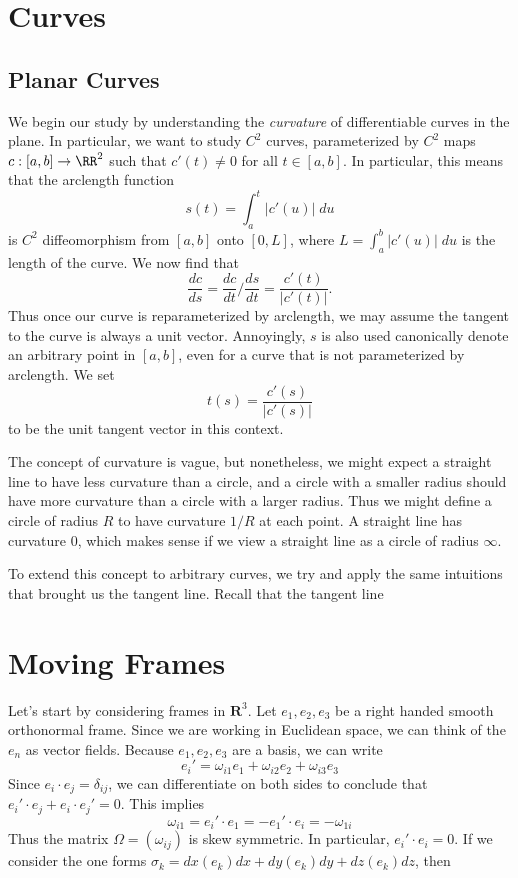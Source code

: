 \chapter{Curves}

\section{Planar Curves}

We begin our study by understanding the \emph{curvature} of differentiable curves in the plane. In particular, we want to study $C^2$ curves, parameterized by $C^2$ maps $c: [a,b] \to \RR^2$ such that $c'(t) \neq 0$ for all $t \in [a,b]$. In particular, this means that the arclength function
%
\[ s(t) = \int_a^t |c'(u)|\; du \]
%
is $C^2$ diffeomorphism from $[a,b]$ onto $[0,L]$, where $L = \int_a^b |c'(u)|\; du$ is the length of the curve. We now find that
%
\[ \frac{dc}{ds} = \frac{dc}{dt} \bigg/ \frac{ds}{dt} = \frac{c'(t)}{|c'(t)|}. \]
%
Thus once our curve is reparameterized by arclength, we may assume the tangent to the curve is always a unit vector. Annoyingly, $s$ is also used canonically denote an arbitrary point in $[a,b]$, even for a curve that is not parameterized by arclength. We set
%
\[ t(s) = \frac{c'(s)}{|c'(s)|} \]
%
to be the unit tangent vector in this context.

The concept of curvature is vague, but nonetheless, we might expect a straight line to have less curvature than a circle, and a circle with a smaller radius should have more curvature than a circle with a larger radius. Thus we might define a circle of radius $R$ to have curvature $1/R$ at each point. A straight line has curvature $0$, which makes sense if we view a straight line as a circle of radius $\infty$.

To extend this concept to arbitrary curves, we try and apply the same intuitions that brought us the tangent line. Recall that the tangent line 




\chapter{Moving Frames}

Let's start by considering frames in $\mathbf{R}^3$. Let $e_1, e_2, e_3$ be a right handed smooth orthonormal frame. Since we are working in Euclidean space, we can think of the $e_n$ as vector fields. Because $e_1, e_2, e_3$ are a basis, we can write
%
\[ e_i' = \omega_{i1} e_1 + \omega_{i2} e_2 + \omega_{i3} e_3 \]
%
Since $e_i \cdot e_j = \delta_{ij}$, we can differentiate on both sides to conclude that $e_i' \cdot e_j + e_i \cdot e_j' = 0$. This implies
%
\[ \omega_{i1} = e_i' \cdot e_1 = - e_1' \cdot e_i = - \omega_{1i} \]
%
Thus the matrix $\Omega = (\omega_{ij})$ is skew symmetric. In particular, $e_i' \cdot e_i = 0$. If we consider the one forms $\sigma_k = dx(e_k) dx + dy(e_k) dy + dz(e_k) dz$, then











